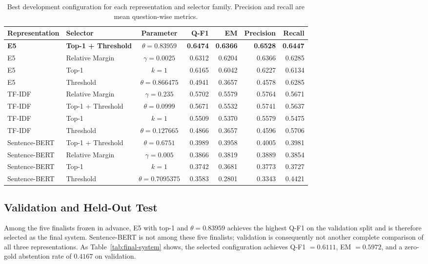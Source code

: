 \documentclass[11pt]{article}
\begin{document}
\begin{table}[t]
\centering
\small
\begin{tabular}{llcrrrr}
\toprule
\textbf{Representation} & \textbf{Selector} & \textbf{Parameter} & \textbf{Q-F1} & \textbf{EM} & \textbf{Precision} & \textbf{Recall} \\
\midrule
\textbf{E5} & \textbf{Top-1 + Threshold} & $\theta=0.83959$ & \textbf{0.6474} & \textbf{0.6366} & \textbf{0.6528} & \textbf{0.6447} \\
E5 & Relative Margin & $\gamma=0.0025$ & 0.6312 & 0.6204 & 0.6366 & 0.6285 \\
E5 & Top-1 & $k=1$ & 0.6165 & 0.6042 & 0.6227 & 0.6134 \\
E5 & Threshold & $\theta=0.866475$ & 0.4941 & 0.3657 & 0.4578 & 0.6285 \\
\midrule
TF-IDF & Relative Margin & $\gamma=0.235$ & 0.5702 & 0.5579 & 0.5764 & 0.5671 \\
TF-IDF & Top-1 + Threshold & $\theta=0.0999$ & 0.5671 & 0.5532 & 0.5741 & 0.5637 \\
TF-IDF & Top-1 & $k=1$ & 0.5509 & 0.5370 & 0.5579 & 0.5475 \\
TF-IDF & Threshold & $\theta=0.127665$ & 0.4866 & 0.3657 & 0.4596 & 0.5706 \\
\midrule
Sentence-BERT & Top-1 + Threshold & $\theta=0.6751$ & 0.3989 & 0.3958 & 0.4005 & 0.3981 \\
Sentence-BERT & Relative Margin & $\gamma=0.005$ & 0.3866 & 0.3819 & 0.3889 & 0.3854 \\
Sentence-BERT & Top-1 & $k=1$ & 0.3742 & 0.3681 & 0.3773 & 0.3727 \\
Sentence-BERT & Threshold & $\theta=0.7095375$ & 0.3583 & 0.2801 & 0.3343 & 0.4421 \\
\bottomrule
\end{tabular}
\caption{Best development configuration for each representation and selector family. Precision and recall are mean question-wise metrics.}
\label{tab:development-results}
\end{table}

\subsection{Validation and Held-Out Test}

Among the five finalists frozen in advance, E5 with top-1 and $\theta=0.83959$ achieves the highest Q-F1 on the validation split and is therefore selected as the final system. Sentence-BERT is not among these five finalists; validation is consequently not another complete comparison of all three representations. As Table~\ref{tab:final-system} shows, the selected configuration achieves Q-F1 $=0.6111$, EM $=0.5972$, and a zero-gold abstention rate of $0.4167$ on validation.
\end{document}
